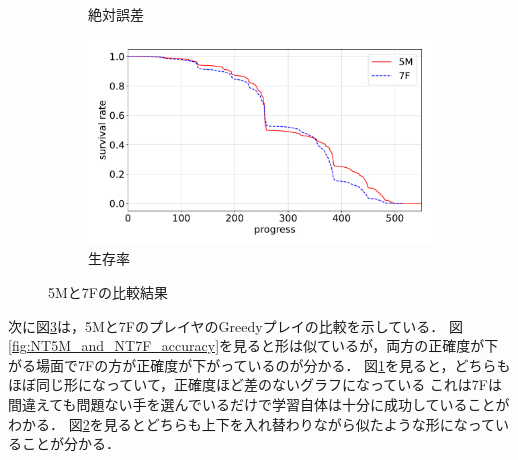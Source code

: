 \begin{figure}[t]
\begin{subfigure}[b]{0.8\linewidth}
    \caption{絶対誤差}
    \label{fig:NT5M_and_NT7F_error_abs}
\end{subfigure}
\begin{subfigure}[b]{0.8\linewidth}
    \includegraphics[width=\linewidth]{pdf/compare/NT5M_and_NT7F/survival.pdf}
    \caption{生存率}
    \label{fig:NT5M_and_NT7F_survival}
\end{subfigure}
\caption{5Mと7Fの比較結果}
\label{fig:NT5M_and_NT7F_results}
\end{figure}

次に図\ref{fig:NT5M_and_NT7F_results}は，5Mと7FのプレイヤのGreedyプレイの比較を示している．
図\ref{fig:NT5M_and_NT7F_accuracy}を見ると形は似ているが，両方の正確度が下がる場面で7Fの方が正確度が下がっているのが分かる．
図\ref{fig:NT5M_and_NT7F_error_abs}を見ると，どちらもほぼ同じ形になっていて，正確度ほど差のないグラフになっている
これは7Fは間違えても問題ない手を選んでいるだけで学習自体は十分に成功していることがわかる．
図\ref{fig:NT5M_and_NT7F_survival}を見るとどちらも上下を入れ替わりながら似たような形になっていることが分かる．
    

